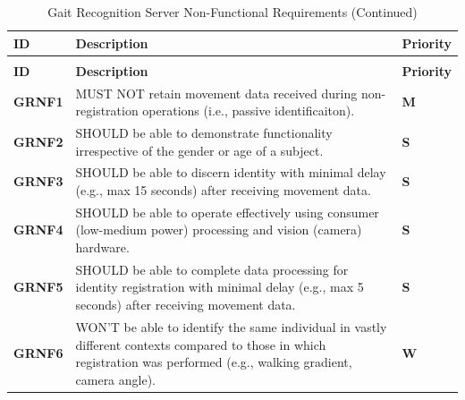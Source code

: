 \begin{scriptsize}
    \begin{longtable}[H]{|p{}|p{}|p{}|}
        \caption{Gait Recognition Server Non-Functional Requirements}
        \label{tab:grs-non-functional-requirements}                                                                                                                                                                                  \\
        \hline
        \textbf{ID}    & \textbf{Description}                                                                                                                                                     & \textbf{Priority}                \\ \hline
        \endfirsthead
        \caption*{Gait Recognition Server Non-Functional Requirements (Continued)}                                                                                                                                                   \\
        \hline
        \textbf{ID}    & \textbf{Description}                                                                                                                                                     & \textbf{Priority}                \\ \hline
        \endhead
        \hline
        \endfoot
        \textbf{GRNF1} & MUST NOT retain movement data received during non-registration operations (i.e., passive identificaiton).                                                                & \cellcolor{red!10} \textbf{M}    \\ 
        \textbf{GRNF2} & SHOULD be able to demonstrate functionality irrespective of the gender or age of a subject.                                                                              & \cellcolor{orange!10} \textbf{S} \\ \hline
        \textbf{GRNF3} & SHOULD be able to discern identity with minimal delay (e.g., max 15 seconds) after receiving movement data.                                                              & \cellcolor{orange!10} \textbf{S} \\ \hline
        \textbf{GRNF4} & SHOULD be able to operate effectively using consumer (low-medium power) processing and vision (camera) hardware.                                                         & \cellcolor{orange!10} \textbf{S} \\ \hline
        \textbf{GRNF5} & SHOULD be able to complete data processing for identity registration with minimal delay (e.g., max 5 seconds) after receiving movement data.                             & \cellcolor{orange!10} \textbf{S} \\ \hline
        \textbf{GRNF6} & WON'T be able to identify the same individual in vastly different contexts compared to those in which registration was performed (e.g., walking gradient, camera angle). & \cellcolor{green!10} \textbf{W}  \\
    \end{longtable}
\end{scriptsize}

